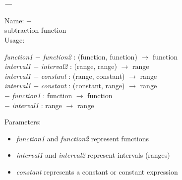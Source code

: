 \subsection{$-$}
\label{labminus}
\noindent Name: \textbf{$-$}\\
subtraction function\\
\noindent Usage: 
\begin{center}
\emph{function1} \textbf{$-$} \emph{function2} : (\textsf{function}, \textsf{function}) $\rightarrow$ \textsf{function}\\
\emph{interval1} \textbf{$-$} \emph{interval2} : (\textsf{range}, \textsf{range}) $\rightarrow$ \textsf{range}\\
\emph{interval1} \textbf{$-$} \emph{constant} : (\textsf{range}, \textsf{constant}) $\rightarrow$ \textsf{range}\\
\emph{interval1} \textbf{$-$} \emph{constant} : (\textsf{constant}, \textsf{range}) $\rightarrow$ \textsf{range}\\
\textbf{$-$} \emph{function1} : \textsf{function} $\rightarrow$ \textsf{function}\\
\textbf{$-$} \emph{interval1} : \textsf{range} $\rightarrow$ \textsf{range}\\
\end{center}
Parameters: 
\begin{itemize}
\item \emph{function1} and \emph{function2} represent functions
\item \emph{interval1} and \emph{interval2} represent intervals (ranges)
\item \emph{constant} represents a constant or constant expression
\end{itemize}
